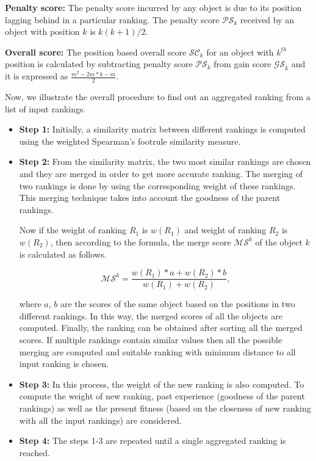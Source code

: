 \documentclass[letterpaper]{article}
\begin{document}
{\bf Penalty score:} The penalty score incurred by any object is due to its position lagging behind in a particular ranking. The penalty score $\mathcal{PS}_k$ received by an object with position $k$ is $k(k+1)/2$.

{\bf Overall score:} The position based overall score $\mathcal{SC}_k$ for an object with $k^{th}$ position is calculated by subtracting penalty score $\mathcal{PS}_k$ from gain score $\mathcal{GS}_k$ and it is expressed as $\frac{m^2 - 2m*k - m}{2}$.

Now, we illustrate the overall procedure to find out an aggregated ranking from a list of input rankings.

\begin{itemize}
\item {\bf Step 1:} Initially, a similarity matrix between different rankings is computed using the weighted Spearman's footrule similarity measure.

\item {\bf Step 2:} From the similarity matrix, the two most similar rankings are chosen and they are merged in order to get more accurate ranking. The merging of two rankings is done by using the corresponding weight of these rankings. This merging technique takes into account the goodness of the parent rankings.

Now if the weight of ranking $R_1$ is $w(R_1)$ and weight of ranking $R_2$ is $w(R_2)$, then according to the formula, the merge score $\mathcal{MS}^k$ of the object $k$ is calculated as follows.

\begin{equation}\label{eq:merge_eqation}
\mathcal {MS}^k  = \frac{w(R_1)*a + w(R_2)*b}{w(R_1) + w(R_2)},
\end{equation}

where $a$, $b$ are the scores of the same object based on the positions in two different rankings. In this way, the merged scores of all the objects are computed. Finally, the ranking can be obtained after sorting all the merged scores. If multiple rankings contain similar values then all the possible merging are computed and suitable ranking with minimum distance to all input ranking is chosen.

\item {\bf Step 3:} In this process, the weight of the new ranking is also computed. To compute the weight of new ranking, past experience (goodness of the parent rankings) as well as the present fitness (based on the closeness of new ranking with all the input rankings) are considered.

\item {\bf Step 4:} The steps 1-3 are repeated until a single aggregated ranking is reached.
\end{itemize}
\end{document}
